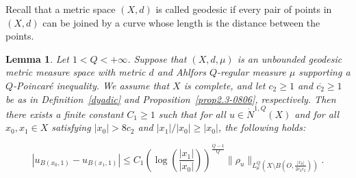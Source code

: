 \documentclass[10pt]{amsart}
\newtheorem{lemma}[theorem]{Lemma}
\numberwithin{equation}{section}
\begin{document}

Recall that a metric space $(X,d)$ is called geodesic if every pair of points in $(X,d)$  can be joined by a curve whose length is the distance between the points.

\begin{lemma}\label{lem3.4-2805}
Let  $1<Q<+\infty$. 
Suppose that $(X,d,\mu)$ is an  unbounded geodesic metric measure space with metric $d$ and Ahlfors $Q$-regular measure $\mu$ supporting a $Q$-Poincar\'e inequality. We assume that $X$ is complete, and let $c_2\ge 1$ and $\overline {c_2}\ge 1$ be as in Definition~\ref{dyadic} and Proposition~\ref{prop2.3-0806}, respectively.
 Then there exists a finite constant $C_1\ge 1$ such that for all $u\in\dot N^{1,Q}(X)$ and for all $x_0,x_1\in X$ satisfying $|x_0|>8c_2$ and $|x_1|/|x_0|\ge |x_0|$, the following holds:
 
 
 \begin{equation}\label{eq3.4-2805 SECOND ATTEMPT}
	|u_{B(x_0,1)}-u_{B(x_1,1)}| \leq C_1\left(\log \left( \frac{|x_1|}{|x_0|}\right)\right)^{\frac{Q-1}{Q}}  \|\rho_u\|_{L^Q_\mu\left(X\setminus B\left(O,\frac{|x_0|}{2{\overline{c_2}c_2}} \right)\right)}.
	\end{equation}
\end{lemma}
\end{document}
